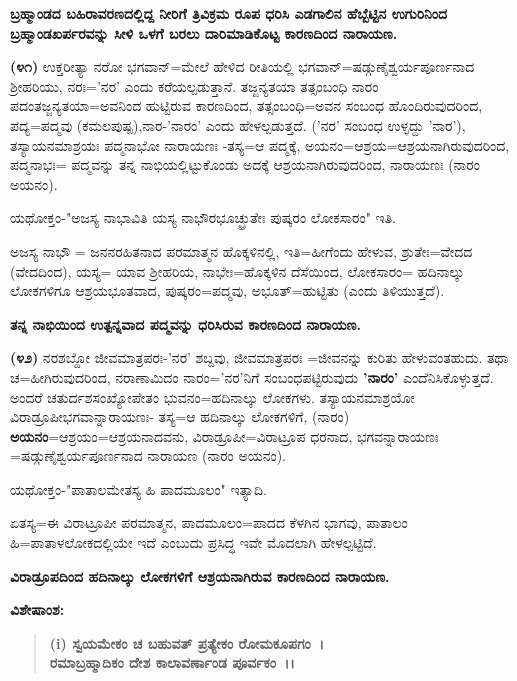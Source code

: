 \newpage

\begin{center}
\textbf{ಬ್ರಹ್ಮಾಂಡದ ಬಹಿರಾವರಣದಲ್ಲಿದ್ದ ನೀರಿಗೆ ತ್ರಿವಿಕ್ರಮ ರೂಪ ಧರಿಸಿ ಎಡಗಾಲಿನ ಹೆಬ್ಬೆಟ್ಟಿನ ಉಗುರಿನಿಂದ ಬ್ರಹ್ಮಾಂಡಖರ್ಪರವನ್ನು ಸೀಳಿ ಒಳಗೆ ಬರಲು ದಾರಿಮಾಡಿಕೊಟ್ಟ ಕಾರಣದಿಂದ ನಾರಾಯಣ.}
\end{center}

\textbf{(೪೧)} ಉಕ್ತರೀತ್ಯಾ ನರೋ ಭಗವಾನ್=ಮೇಲೆ ಹೇಳಿದ ರೀತಿಯಲ್ಲಿ ಭಗವಾನ್=ಷಡ್ಗುಣೈ\-ಶ್ವರ್ಯಪೂರ್ಣನಾದ ಶ‍್ರೀಹರಿಯು, ನರಃ='ನರ' ಎಂದು ಕರೆಯಲ್ಪಡುತ್ತಾನೆ. ತಜ್ಜನ್ಯತಯಾ ತತ್ಸಂಬಂಧಿ ನಾರಂ ಪದಂತಜ್ಜನ್ಯತಯಾ=ಅವನಿಂದ ಹುಟ್ಟಿರುವ ಕಾರಣದಿಂದ, ತತ್ಸಂಬಂಧಿ=ಅವನ ಸಂಬಂಧ ಹೊಂದಿರುವುದರಿಂದ, ಪದ್ಯ=ಪದ್ಮವು (ಕಮಲಪುಷ್ಪ),\break ನಾರ-'ನಾರಂ' ಎಂದು ಹೇಳಲ್ಪಡುತ್ತದೆ. ('ನರ' ಸಂಬಂಧ ಉಳ್ಳದ್ದು 'ನಾರ'), ತಸ್ಯಾಯನಮಾಶ್ರಯಃ ಪದ್ಮನಾಭೋ ನಾರಾಯಣಃ -ತಸ್ಯ=ಆ ಪದ್ಮಕ್ಕೆ, ಅಯನಂ=ಆಶ್ರಯ=ಆಶ್ರಯ\-ನಾಗಿರುವುದರಿಂದ, ಪದ್ಮನಾಭಃ= ಪದ್ಮವನ್ನು ತನ್ನ ನಾಭಿಯಲ್ಲಿಟ್ಟುಕೊಂಡು ಅದಕ್ಕೆ ಆಶ್ರಯನಾಗಿರುವುದರಿಂದ, ನಾರಾಯಣಃ (ನಾರಂ ಅಯನಂ).

ಯಥೋಕ್ತಂ-"ಅಜಸ್ಯ ನಾಭಾವಿತಿ ಯಸ್ಯ ನಾಭೌರಭೂಚ್ಛ್ರುತೇಃ ಪುಷ್ಕರಂ ಲೋಕಸಾರಂ" ಇತಿ.

ಅಜಸ್ಯ ನಾಭೌ = ಜನನರಹಿತನಾದ ಪರಮಾತ್ಮನ ಹೊಕ್ಕಳಿನಲ್ಲಿ, ಇತಿ=ಹೀಗೆಂದು ಹೇಳುವ, ಶ್ರುತೇಃ=ವೇದದ (ವೇದದಿಂದ), ಯಸ್ಯ= ಯಾವ ಶ‍್ರೀಹರಿಯ, ನಾಭೇಃ=ಹೊಕ್ಕಳಿನ ದೆಸೆಯಿಂದ, ಲೋಕಸಾರಂ= ಹದಿನಾಲ್ಕು ಲೋಕಗಳಿಗೂ ಆಶ್ರಯಭೂತವಾದ, ಪುಷ್ಕರಂ=\-ಪದ್ಮವು, ಅಭೂತ್=ಹುಟ್ಟಿತು (ಎಂದು ತಿಳಿಯುತ್ತದೆ).

\begin{center}
\textbf{ತನ್ನ ನಾಭಿಯಿಂದ ಉತ್ಪನ್ನವಾದ ಪದ್ಮವನ್ನು ಧರಿಸಿರುವ ಕಾರಣದಿಂದ ನಾರಾಯಣ.}
\end{center}

\textbf{(೪೨)} ನರಶಬ್ದೋ ಜೀವಮಾತ್ರಪರಃ-'ನರ' ಶಬ್ದವು, ಜೀವಮಾತ್ರಪರಃ =ಜೀವನನ್ನು ಕುರಿತು ಹೇಳುವಂತಹುದು. ತಥಾ ಚ=ಹೀಗಿರುವುದರಿಂದ, ನರಾಣಾಮಿದಂ ನಾರಂ='ನರ'\-ನಿಗೆ ಸಂಬಂಧಪಟ್ಟಿರುವುದು \textbf{'ನಾರಂ'} ಎಂದೆನಿಸಿಕೊಳ್ಳುತ್ತದೆ. ಅಂದರೆ ಚತುರ್ದಶಸಂಖ್ಯೋ\-ಪೇತಂ ಭುವನಂ=ಹದಿನಾಲ್ಕು ಲೋಕಗಳು. ತಸ್ಯಾಯನಮಾಶ್ರಯೋ ವಿರಾಡ್ರೂಪೀ\break ಭಗವಾನ್ನಾ\-ರಾಯಣಃ- ತಸ್ಯ=ಆ ಹದಿನಾಲ್ಕು ಲೋಕಗಳಿಗೆ, (ನಾರಂ) \textbf{ಅಯನಂ}=ಆಶ್ರಯಂ\-=ಆಶ್ರಯ\-ನಾದವನು, ವಿರಾಡ್ರೂಪೀ=ವಿರಾಟ್ರೂಪ ಧರನಾದ, ಭಗವನ್ನಾರಾಯಣಃ =\-ಷಡ್ಗುಣೈಶ್ವರ್ಯಪೂರ್ಣನಾದ ನಾರಾಯಣ (ನಾರಂ ಅಯನಂ).

ಯಥೋಕ್ತಂ-"ಪಾತಾಲಮೇತಸ್ಯ ಹಿ ಪಾದಮೂಲಂ" ಇತ್ಯಾದಿ.

ಏತಸ್ಯ=ಈ ವಿರಾಟ್ರೂಪೀ ಪರಮಾತ್ಮನ, ಪಾದಮೂಲಂ=ಪಾದದ ಕೆಳಗಿನ ಭಾಗವು, ಪಾತಾಲಂ ಹಿ=ಪಾತಾಳಲೋಕದಲ್ಲಿಯೇ ಇದೆ ಎಂಬುದು ಪ್ರಸಿದ್ಧ ಇವೇ ಮೊದಲಾಗಿ ಹೇಳಲ್ಪಟ್ಟಿದೆ.

\begin{center}
\textbf{ವಿರಾಡ್ರೂಪದಿಂದ ಹದಿನಾಲ್ಕು ಲೋಕಗಳಿಗೆ ಆಶ್ರಯನಾಗಿರುವ ಕಾರಣದಿಂದ ನಾರಾಯಣ.}
\end{center}

\noindent
\textbf{ವಿಶೇಷಾಂಶ:\enginline{-}}

\begin{verse}
\textbf{(i) ಸ್ವಯಮೇಕಂ ಚ ಬಹುವತ್ ಪ್ರತ್ಯೇಕಂ ರೋಮಕೂಪಗಂ~।}\\\textbf{ರಮಾಬ್ರಹ್ಮಾದಿಕಂ ದೇಶ ಕಾಲಾವರ್ಣಾಂಡ ಪೂರ್ವಕಂ~।।}
\end{verse}

